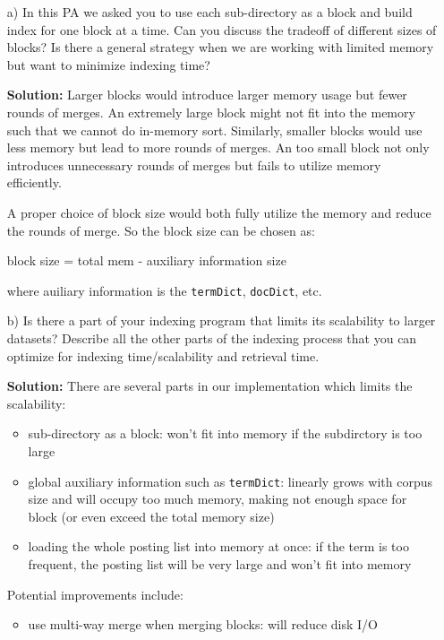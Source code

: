 \documentclass{article}
\begin{document}
\begin{itemize}
  \item[a)] In this PA we asked you to use each sub-directory as a block and build
  index for one block at a time. Can you discuss the tradeoff of different
  sizes of blocks? Is there a general strategy when we are working with
  limited memory but want to minimize indexing time?
  
  \textbf{Solution:} Larger blocks would introduce larger memory usage but
  fewer rounds of merges. An extremely large block might not fit into the
  memory such that we cannot do in-memory sort. Similarly, smaller blocks
  would use less memory but lead to more rounds of merges. An too small block
  not only introduces unnecessary rounds of merges but fails to utilize memory
  efficiently.
  
  A proper choice of block size would both fully utilize the memory and reduce
  the rounds of merge. So the block size can be chosen as:
  
  \begin{center}
    block size = total mem - auxiliary information size
  \end{center}
  
  where auiliary information is the {\texttt{termDict}}, {\texttt{docDict}}, etc.
  
  \item[b)] Is there a part of your indexing program that limits its scalability
  to larger datasets? Describe all the other parts of the indexing process
  that you can optimize for indexing time/scalability and retrieval time.
  
  \textbf{Solution:} There are several parts in our implementation which
  limits the scalability:
  \begin{itemize}
    \item sub-directory as a block: won't fit into memory if the subdirctory
    is too large
    
    \item global auxiliary information such as {\texttt{termDict}}: linearly
    grows with corpus size and will occupy too much memory, making not enough
    space for block (or even exceed the total memory size)
    
    \item loading the whole posting list into memory at once: if the term is
    too frequent, the posting list will be very large and won't fit into
    memory
  \end{itemize}
  Potential improvements include:
  \begin{itemize}
    \item use multi-way merge when merging blocks: will reduce disk I/O
    

\end{itemize}
\end{itemize}
\end{document}
